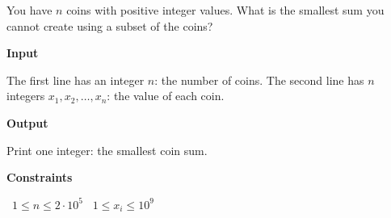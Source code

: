 You have $n$ coins with positive integer values. What is the smallest sum you cannot create using a subset of the coins?

\vspace{0.3cm}\noindent\textbf{Input}

The first line has an integer $n$: the number of coins.
The second line has $n$ integers $x_1,x_2,\dots,x_n$: the value of each coin.

\vspace{0.3cm}\noindent\textbf{Output}

Print one integer: the smallest coin sum.

\vspace{0.3cm}\noindent\textbf{Constraints}

\textbullet\ $1 \le n \le 2 \cdot 10^5$
\textbullet\ $1 \le x_i \le 10^9$